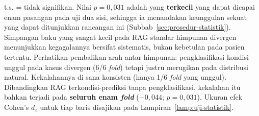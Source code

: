 \begin{table}[htbp]
\vspace{0.4em}
{\tabnotestyle t.s. = tidak signifikan. Nilai $p=0{,}031$ adalah yang \textbf{terkecil} yang dapat dicapai enam pasangan pada uji dua sisi, sehingga ia menandakan keunggulan sekuat yang dapat ditunjukkan rancangan ini (Subbab~\ref{sec:prosedur-statistik}). Simpangan baku yang sangat kecil pada RAG standar himpunan divergen menunjukkan kegagalannya bersifat sistematis, bukan kebetulan pada pasien tertentu. Perhatikan pembalikan arah antar-himpunan: pengklasifikasi kondisi unggul pada kasus divergen (6/6 \emph{fold}) tetapi justru merugikan pada distribusi natural. Kekalahannya di sana konsisten (hanya 1/6 \emph{fold} yang unggul). Dibandingkan RAG terkondisi-prediksi tanpa pengklasifikasi, kekalahan itu bahkan terjadi pada \textbf{seluruh enam \emph{fold}} ($-0{,}044$; $p=0{,}031$). Ukuran efek Cohen's $d_z$ untuk tiap baris disajikan pada Lampiran~\ref{lamp:uji-statistik}.\par}
\end{table}
